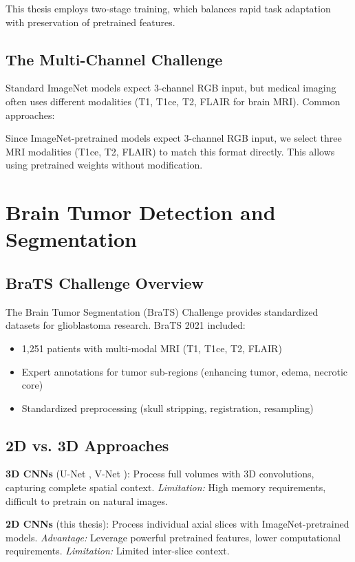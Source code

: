 This thesis employs two-stage training, which balances rapid task adaptation with preservation of pretrained features.

\subsection{The Multi-Channel Challenge}

Standard ImageNet models expect 3-channel RGB input, but medical imaging often uses different modalities (T1, T1ce, T2, FLAIR for brain MRI). Common approaches:

Since ImageNet-pretrained models expect 3-channel RGB input, we select three MRI modalities (T1ce, T2, FLAIR) to match this format directly. This allows using pretrained weights without modification.

\section{Brain Tumor Detection and Segmentation}

\subsection{BraTS Challenge Overview}

The Brain Tumor Segmentation (BraTS) Challenge \cite{menze2015multimodal, bakas2018identifying} provides standardized datasets for glioblastoma research. BraTS 2021 included:
\begin{itemize}
    \item 1,251 patients with multi-modal MRI (T1, T1ce, T2, FLAIR)
    \item Expert annotations for tumor sub-regions (enhancing tumor, edema, necrotic core)
    \item Standardized preprocessing (skull stripping, registration, resampling)
\end{itemize}

\subsection{2D vs. 3D Approaches}

\textbf{3D CNNs} (U-Net \cite{ronneberger2015u}, V-Net \cite{milletari2016v}): Process full volumes with 3D convolutions, capturing complete spatial context. \textit{Limitation:} High memory requirements, difficult to pretrain on natural images.

\textbf{2D CNNs} (this thesis): Process individual axial slices with ImageNet-pretrained models. \textit{Advantage:} Leverage powerful pretrained features, lower computational requirements. \textit{Limitation:} Limited inter-slice context.

